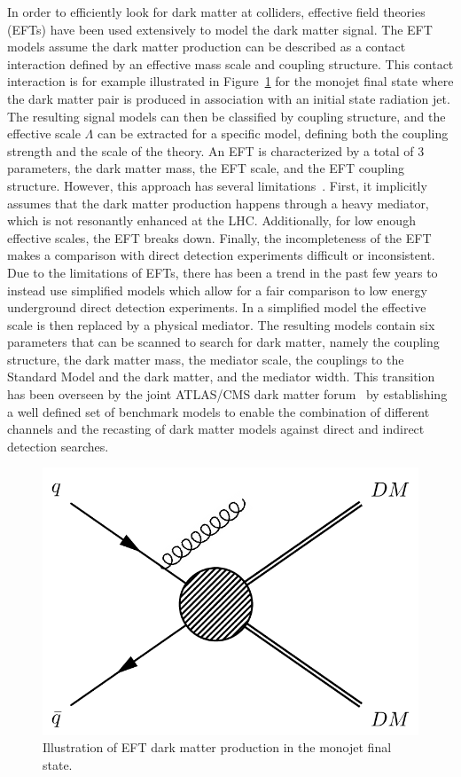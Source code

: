 In order to efficiently look for dark matter at colliders, effective field theories (EFTs) have been used extensively to model the dark matter signal. The EFT models assume the dark matter production can be described as a contact interaction defined by an effective mass scale and coupling structure. This contact interaction is for example illustrated in Figure~\ref{fig:monojet_diagram} for the monojet final state where the dark matter pair is produced in association with an initial state radiation jet. The resulting signal models can then be classified by coupling structure, and the effective scale $\Lambda$ can be extracted for a specific model, defining both the coupling strength and the scale of the theory. An EFT is characterized by a total of 3 parameters, the dark matter mass, the EFT scale, and the EFT coupling structure. However, this approach has several limitations~\cite{Busoni:2013lha,Busoni:2014sya,Busoni:2014haa}. First, it implicitly assumes that the dark matter production happens through a heavy mediator, which is not resonantly enhanced at the \ac{LHC}. Additionally, for low enough effective scales, the EFT breaks down. Finally, the incompleteness of the EFT makes a comparison with direct detection experiments difficult or inconsistent. Due to the limitations of EFTs, there has been a trend in the past few years to instead use simplified models which allow for a fair comparison to low energy underground direct detection experiments. In a simplified model the effective scale is then replaced by a physical mediator. The resulting models contain six parameters that can be scanned to search for dark matter, namely the coupling structure, the dark matter mass, the mediator scale, the couplings to the Standard Model and the dark matter, and the mediator width. This transition has been overseen by the joint \acs{ATLAS}/\acs{CMS} dark matter forum~\cite{Abercrombie:2015wmb} by establishing a well defined set of benchmark models to enable the combination of different channels and the recasting of dark matter models against direct and indirect detection searches.

\begin{figure}[ht]
  \centering
 \includegraphics[width=.4\textwidth]{monojet.png} 
 \caption{Illustration of EFT dark matter production in the monojet final state.}
 \label{fig:monojet_diagram}
\end{figure}

